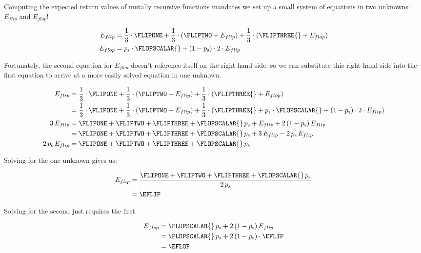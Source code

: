 Computing the expected return values of mutally recursive functions mandates we set up a small system of equations in two unknowns: $E_{flip}$ and $E_{flop}$!

\begin{equation*}
\begin{split}
    E_{flip} &= \frac{1}{3} \cdot \FLIPONE + \frac{1}{3} \cdot (\FLIPTWO + E_{flip}) + \frac{1}{3} \cdot (\FLIPTHREE{} + E_{flop}) \\
    E_{flop} &= p_{\text{s}} \cdot \FLOPSCALAR{} + (1 - p_{\text{s}}) \cdot 2 \cdot E_{flip} \\
\end{split}
\end{equation*}

Fortunately, the second equation for $E_{flop}$ doesn't reference itself on the right-hand side, so we can substitute this right-hand side into the first equation to arrive at a more easily solved equation in one unknown.

\begin{equation*}
\begin{split}
                             E_{flip} &= \frac{1}{3} \cdot \FLIPONE + \frac{1}{3} \cdot (\FLIPTWO + E_{flip}) + \frac{1}{3} \cdot (\FLIPTHREE{} + E_{flop}) \\
                                      &= \frac{1}{3} \cdot \FLIPONE + \frac{1}{3} \cdot (\FLIPTWO + E_{flip}) + \frac{1}{3} \cdot (\FLIPTHREE{} + p_{\text{s}} \cdot \FLOPSCALAR{} + (1 - p_{\text{s}}) \cdot 2 \cdot E_{flip}) \\
                          3\,E_{flip} &= \FLIPONE + \FLIPTWO + \FLIPTHREE + \FLOPSCALAR{}\,p_{\text{s}} + E_{flip} + 2\,(1 - p_{\text{s}})\,E_{flip} \\
                                      &= \FLIPONE + \FLIPTWO + \FLIPTHREE + \FLOPSCALAR{}\,p_{\text{s}} + 3\,E_{flip} - 2\,p_{\text{s}}\,E_{flip} \\    
            2\,p_{\text{s}}\,E_{flip} &= \FLIPONE + \FLIPTWO + \FLIPTHREE + \FLOPSCALAR{}\,p_{\text{s}}                                        
\end{split}
\end{equation*}

Solving for the one unknown gives us:

\begin{equation*}
\begin{split}
    E_{flip} &= \frac{\FLIPONE + \FLIPTWO + \FLIPTHREE + \FLOPSCALAR{}\,p_{\text{s}}}{2\,p_{\text{s}}} \\
             &= \EFLIP
\end{split}
\end{equation*}

Solving for the second just requires the first

\begin{equation*}
\begin{split}
    E_{flop} &= \FLOPSCALAR{}\,p_{\text{s}} + 2 \, (1 - p_{\text{s}}) \, E_{flip} \\
             &= \FLOPSCALAR{}\,p_{\text{s}} + 2 \, (1 - p_{\text{s}}) \cdot \EFLIP \\
             &= \EFLOP
\end{split}
\end{equation*}
